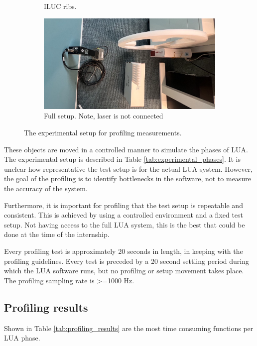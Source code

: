 \begin{figure}[H]
\begin{subfigure}{0.45\textwidth}
        \caption{ILUC ribs.}
    \end{subfigure}
    \centering
    \begin{subfigure}{0.9\textwidth}
        \centering
        \includegraphics[width=\textwidth]{images/test_setup.png}
        \caption{Full setup. Note, laser is not connected}
    \end{subfigure}
    \caption{The experimental setup for profiling measurements.}
\end{figure}

These objects are moved in a controlled manner to simulate the phases of LUA. The experimental setup is described in Table \ref{tab:experimental_phases}. It is unclear how representative the test setup is for the actual LUA system. However, the goal of the profiling is to identify bottlenecks in the software, not to measure the accuracy of the system. 

Furthermore, it is important for profiling that the test setup is repeatable and consistent. This is achieved by using a controlled environment and a fixed test setup. Not having access to the full LUA system, this is the best that could be done at the time of the internship.



Every profiling test is approximately 20 seconds in length, in keeping with the profiling guidelines. Every test is preceded by a 20 second settling period during which the LUA software runs, but no profiling or setup movement takes place. The profiling sampling rate is >=1000 Hz.

\subsection{Profiling results} \label{ssec:profiling_results}
Shown in Table \ref{tab:profiling_results} are the most time consuming functions per LUA phase.

